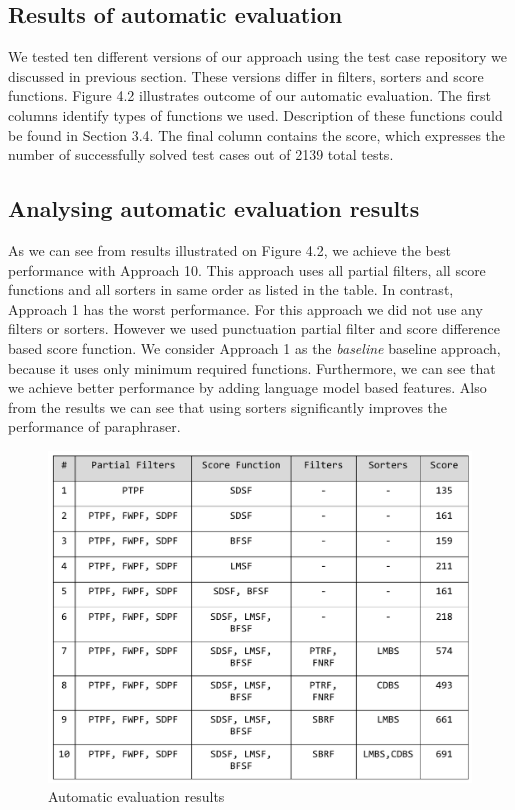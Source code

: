 \subsection{Results of automatic evaluation}

We tested ten different versions of our approach using the test case repository we discussed in previous section. These versions differ in filters, sorters and score functions. Figure 4.2 illustrates outcome of our automatic evaluation. The first columns identify types of functions we used. Description of these functions could be found in Section 3.4. The final column contains the score, which expresses the number of successfully solved test cases out of 2139 total tests.

\subsection{Analysing automatic evaluation results}

As we can see from results illustrated on Figure 4.2, we achieve the best performance with Approach 10. This approach uses all partial filters, all score functions and all sorters in same order as listed in the table. In contrast, Approach 1 has the worst performance. For this approach we did not use any filters or sorters. However we used punctuation partial filter and score difference based score function. We consider Approach 1 as the \emph{baseline} baseline approach, because it uses only minimum required functions. Furthermore, we can see that we achieve better performance by adding language model based features. Also from the results we can see that using sorters significantly improves the performance of paraphraser.


\begin{figure}
 \centering 
 \includegraphics[scale=0.75]{g/eval-auto-results.pdf}
 \caption{Automatic evaluation results}
\end{figure}


